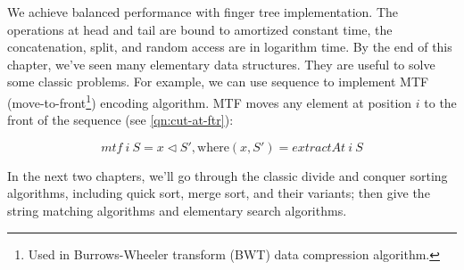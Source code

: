 \documentclass[b5paper]{article}
\begin{document}
We achieve balanced performance with finger tree implementation. The operations at head and tail are bound to amortized constant time, the concatenation, split, and random access are in logarithm time\cite{hackage-ftr}. By the end of this chapter, we've seen many elementary data structures. They are useful to solve some classic problems. For example, we can use sequence to implement MTF (move-to-front\footnote{Used in Burrows-Wheeler transform (BWT) data compression algorithm.}) encoding algorithm\cite{mtf-wiki}. MTF moves any element at position $i$ to the front of the sequence (see \cref{qn:cut-at-ftr}):

\[
mtf\ i\ S = x \lhd S', \text{where}(x, S') = \textit{extractAt}\ i\ S
\]

In the next two chapters, we'll go through the classic divide and conquer sorting algorithms, including quick sort, merge sort, and their variants; then give the string matching algorithms and elementary search algorithms.

\begin{Exercise}\label{ex:finger-tree-index}
\end{Exercise}
\end{document}
